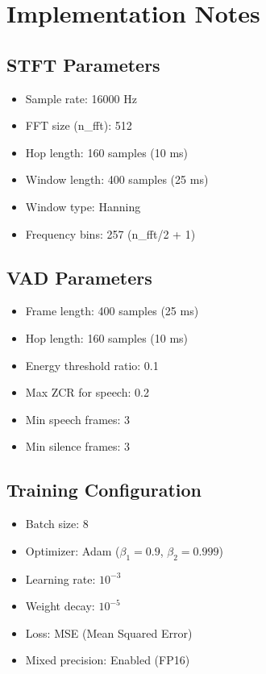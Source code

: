 \documentclass[12pt,a4paper]{article}
\begin{document}
\section{Implementation Notes}

\subsection{STFT Parameters}
\begin{itemize}
    \item Sample rate: 16000 Hz
    \item FFT size (n\_fft): 512
    \item Hop length: 160 samples (10 ms)
    \item Window length: 400 samples (25 ms)
    \item Window type: Hanning
    \item Frequency bins: 257 (n\_fft/2 + 1)
\end{itemize}

\subsection{VAD Parameters}
\begin{itemize}
    \item Frame length: 400 samples (25 ms)
    \item Hop length: 160 samples (10 ms)
    \item Energy threshold ratio: 0.1
    \item Max ZCR for speech: 0.2
    \item Min speech frames: 3
    \item Min silence frames: 3
\end{itemize}

\subsection{Training Configuration}
\begin{itemize}
    \item Batch size: 8
    \item Optimizer: Adam ($\beta_1=0.9$, $\beta_2=0.999$)
    \item Learning rate: $10^{-3}$
    \item Weight decay: $10^{-5}$
    \item Loss: MSE (Mean Squared Error)
    \item Mixed precision: Enabled (FP16)
\end{itemize}
\end{document}
